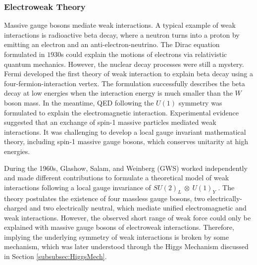 \subsubsection{Electroweak Theory}
\label{subsubsec:EWkUni}
Massive gauge bosons mediate weak interactions. A typical example of weak interactions is radioactive beta decay, where a neutron turns into a proton by emitting an electron and an anti-electron-neutrino. The Dirac equation formulated in $1930$s could explain the motions of electrons via relativistic quantum mechanics. However, the nuclear decay processes were still a mystery. Fermi developed the first theory of weak interaction to explain beta decay using a four-fermion-interaction vertex. The formulation successfully describes the beta decay at low energies when the interaction energy is much smaller than the $W$ boson mass. In the meantime, QED following the $U(1)$ symmetry was formulated to explain the electromagnetic interaction. Experimental evidence suggested that an exchange of spin-1 massive particles mediated weak interactions. It was challenging to develop a local gauge invariant mathematical theory, including spin-1 massive gauge bosons, which conserves unitarity at high energies. 

During the 1960s, Glashow, Salam, and Weinberg (GWS) worked independently and made different contributions to formulate a theoretical model of weak interactions following a local gauge invariance of $SU(2)_{L}~\otimes~U(1)_{Y}$ \cite{GLASHOW1961579}\cite{EWK_W}\cite{EWK_S}. The theory postulates the existence of four massless gauge bosons, two electrically-charged and two electrically neutral, which mediate unified electromagnetic and weak interactions. However, the observed short range of weak force could only be explained with massive gauge bosons of electroweak interactions. Therefore, implying the underlying symmetry of weak interactions is broken by some mechanism, which was later understood through the Higgs Mechanism discussed in Section \ref{subsubsec:HiggsMech}. 

